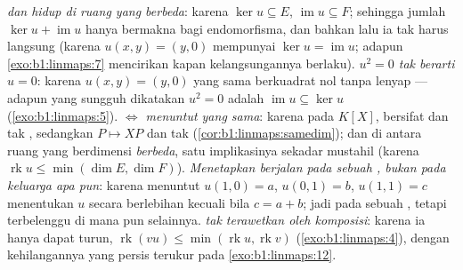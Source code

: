 \begin{remark}
\label{rem:b1:linmaps:pitfalls}
\emph{ dan  hidup di ruang yang berbeda}: karena $\ker u
\subseteq E$, $\operatorname{im} u \subseteq F$; sehingga jumlah $\ker u
+ \operatorname{im} u$ hanya bermakna bagi endomorfisma, dan
bahkan lalu ia tak harus langsung (karena $u(x, y) = (y, 0)$ mempunyai $\ker u
= \operatorname{im} u$; adapun \cref{exo:b1:linmaps:7} mencirikan
kapan kelangsungannya berlaku).
\emph{$u^2 = 0$ tak berarti $u = 0$}: karena $u(x,y) =
(y, 0)$ yang sama berkuadrat nol tanpa lenyap --- adapun yang sungguh dikatakan $u^2 = 0$
adalah $\operatorname{im} u \subseteq \ker u$
(\cref{exo:b1:linmaps:5}).
\emph{ $\iff$  menuntut  yang
sama}: karena pada $K[X]$,  bersifat  dan tak
, sedangkan $P \mapsto XP$  dan tak 
(\cref{cor:b1:linmaps:samedim}); dan di antara ruang yang
berdimensi \emph{berbeda}, satu implikasinya sekadar
mustahil (karena $\operatorname{rk} u \leq \min(\dim E, \dim F)$).
\emph{Menetapkan  berjalan pada sebuah , bukan pada keluarga apa pun}:
karena menuntut $u(1, 0) = a$, $u(0, 1) = b$, $u(1, 1) = c$
menentukan $u$ secara berlebihan kecuali bila $c = a + b$; jadi   pada sebuah
, tetapi terbelenggu di mana pun selainnya.
\emph{ tak terawetkan oleh komposisi}: karena ia hanya dapat turun,
$\operatorname{rk}(vu) \leq \min(\operatorname{rk} u,
\operatorname{rk} v)$ (\cref{exo:b1:linmaps:4}), dengan kehilangannya yang persis
terukur pada \cref{exo:b1:linmaps:12}.
\end{remark}

